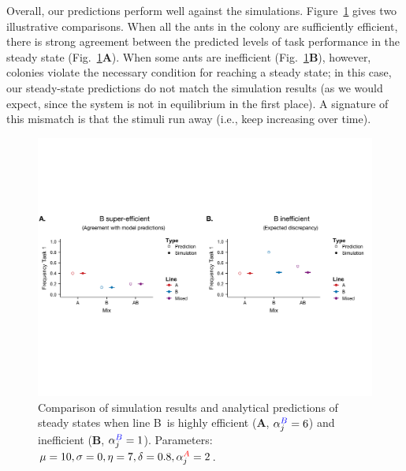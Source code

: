 \documentclass[11pt]{article}
\newcommand{\A}{{\color{red}A}}
\newcommand{\B}{{\color{blue}B}}
\begin{document}
Overall, our predictions perform well against the simulations. Figure~\ref{fig:5050_comp} gives two illustrative comparisons. When all the ants in the colony are sufficiently efficient, there is strong agreement between the predicted levels of task performance in the steady state (Fig.~\ref{fig:5050_comp}\textbf{A}). When some ants are inefficient (Fig.~\ref{fig:5050_comp}\textbf{B}), however, colonies violate the necessary condition for reaching a steady state; in this case, our steady-state predictions do not match the simulation results (as we would expect, since the system is not in equilibrium in the first place). A signature of this mismatch is that the stimuli run away (i.e., keep increasing over time).
\begin{figure}[H]
    \centering
    \includegraphics[trim={0 2.5in 0 2.4in}, clip, width=1\linewidth]{./model_comparison_deltaalpha.pdf}
    \caption{Comparison of simulation results and analytical predictions of steady states when line \B\ is highly efficient (\textbf{A}, $\alpha_j^{\B} = 6$) and inefficient (\textbf{B}, $\alpha_j^{\B} = 1$). Parameters: $\mu = 10, \sigma = 0, \eta = 7, \delta = 0.8,  \alpha_j^{\A} = 2$. }
    \label{fig:5050_comp}
\end{figure}
\end{document}
